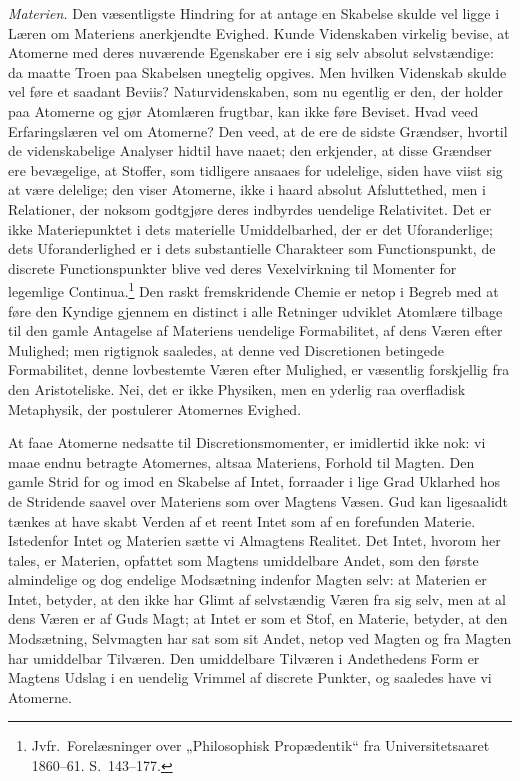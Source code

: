 \documentclass[12pt]{book}
\begin{document}
\emph{Materien.} Den væsentligste Hindring for at antage en Skabelse
skulde vel ligge i Læren om Materiens anerkjendte Evighed. Kunde
Videnskaben virkelig bevise, at Atomerne med deres nuværende
Egenskaber ere i sig selv absolut selvstændige: da maatte Troen paa
Skabelsen unegtelig opgives. Men hvilken Videnskab skulde vel føre
et saadant Beviis? Naturvidenskaben, som nu egentlig er den, der
holder paa Atomerne og gjør Atomlæren frugtbar, kan ikke føre
Beviset. Hvad veed Erfaringslæren vel om Atomerne? Den veed, at de
ere de sidste Grændser, hvortil de videnskabelige Analyser hidtil
have naaet; den erkjender, at disse Grændser ere bevægelige,
at Stoffer, som tidligere ansaaes for udelelige, siden have viist
sig at være delelige; den viser Atomerne, ikke i haard absolut
Afsluttethed, men i Relationer, der noksom godtgjøre deres indbyrdes
uendelige Relativitet. Det er ikke Materiepunktet i dets materielle
Umiddelbarhed, der er det Uforanderlige; dets Uforanderlighed er i
dets substantielle Charakteer som Functionspunkt, de discrete
Functionspunkter blive ved deres Vexelvirkning til Momenter for
legemlige Continua.\footnote{Jvfr.\ Forelæsninger over „Philosophisk
Propædentik“ fra Universitetsaaret 1860--61. S.\ 143--177.} Den
raskt fremskridende Chemie er netop i Begreb med at føre den Kyndige
gjennem en distinct i alle Retninger udviklet Atomlære tilbage til
den gamle Antagelse af Materiens uendelige Formabilitet, af dens
Væren efter Mulighed; men rigtignok saaledes, at denne ved
Discretionen betingede Formabilitet, denne lovbestemte Væren efter
Mulighed, er væsentlig forskjellig fra den Aristoteliske. Nei, det
er ikke Physiken, men en yderlig raa overfladisk Metaphysik, der
postulerer Atomernes Evighed.

At faae Atomerne nedsatte til Discretionsmomenter, er imidlertid
ikke nok: vi maae endnu betragte Atomernes, altsaa Materiens,
Forhold til Magten. Den gamle Strid for og imod en Skabelse af
Intet, forraader i lige Grad Uklarhed hos de Stridende saavel over
Materiens som over Magtens Væsen. Gud kan ligesaalidt tænkes at have
skabt Verden af et reent Intet som af en forefunden Materie.
Istedenfor Intet og Materien sætte vi Almagtens Realitet. Det Intet,
hvorom her tales, er Materien, opfattet som Magtens umiddelbare
Andet, som den første almindelige og dog endelige Modsætning
indenfor Magten selv: at Materien er Intet, betyder, at den ikke har
Glimt af selvstændig Væren fra sig selv, men at al dens Væren er af
Guds Magt; at Intet er som et Stof, en
Materie, betyder, at den Modsætning, Selvmagten har sat som sit
Andet, netop ved Magten og fra Magten har umiddelbar Tilværen. Den
umiddelbare Tilværen i Andethedens Form er Magtens Udslag i en
uendelig Vrimmel af discrete Punkter, og saaledes have vi Atomerne.
\end{document}
